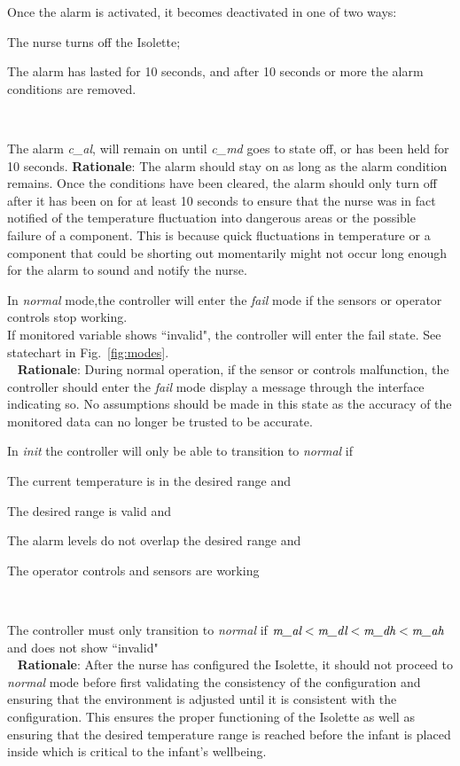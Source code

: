 {Once the alarm is activated, it becomes deactivated in one of two ways:
\begin{mylist}
\item The nurse turns off the Isolette;
\item The alarm has lasted for 10 seconds, and after 10 seconds or more the alarm conditions are removed.
\end{mylist}~}
{The alarm \emph{c\_al}, will remain on until \emph{c\_md} goes to state off, or has been held for 10 seconds.}
\label{R4}
\noindent \textbf{Rationale}: The alarm should stay on as long as the alarm condition remains. Once the conditions have been cleared, the alarm should only turn off after it has been on for at least 10 seconds to ensure that the nurse was in fact notified of the temperature fluctuation into dangerous areas or the possible failure of a component. This is because quick fluctuations in temperature or a component that could be shorting out momentarily might not occur long enough for the alarm to sound and notify the nurse.

{In \emph{normal} mode,the controller will enter the \emph{fail} mode if the sensors or operator controls stop working.\\}
{If monitored variable  shows ``invalid", the controller will enter the fail state. See statechart in Fig.~\ref{fig:modes}.\\~}
\label{R5}
\noindent \textbf{Rationale}: During normal operation, if the sensor or controls malfunction, the controller should enter the \emph{fail} mode display a message through the interface indicating so. No assumptions should be made in this state as the accuracy of the monitored data can no longer be trusted to be accurate.

{In \emph{init} the controller will only be able to transition to \emph{normal} if
\begin{mylist}
\item The current temperature is in the desired range and
\item The desired range is valid and
\item The alarm levels do not overlap the desired range and
\item The operator controls and sensors are working
\end{mylist}~}
{The controller must only transition to \emph{normal} if $\textit{m\_al} < \textit{m\_dl} < \textit{m\_dh} < \textit{m\_ah}$ and  does not show ``invalid"\\~}
\label{R6}
\noindent \textbf{Rationale}: After the nurse has configured the Isolette, it should not proceed to \emph{normal} mode before first validating the consistency of the configuration and ensuring that the environment is adjusted until it is consistent with the configuration. This ensures the proper functioning of the Isolette as well as ensuring that the desired temperature range is reached before the infant is placed inside which is critical to the infant's wellbeing.

